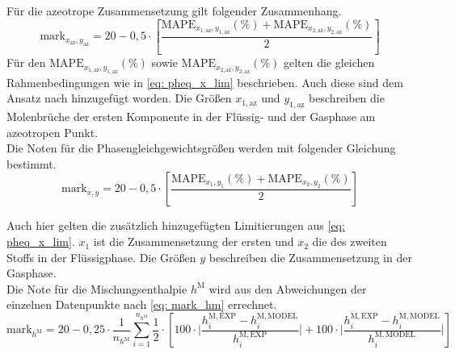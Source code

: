 \documentclass[../thesis.tex]{subfiles}
\begin{document}
Für die azeotrope Zusammensetzung gilt folgender Zusammenhang.
\begin{equation}
\mathrm{mark}_{x_\mathrm{az},y_\mathrm{az}} = 20 - 0,5 \cdot \left[
	\dfrac{\mathrm{MAPE}_{x_{1,\mathrm{az}},y_{1,\mathrm{az}}}(\%) + \mathrm{MAPE}_{x_{2,\mathrm{az}},y_{2,\mathrm{az}}}(\%)}{2}
\right]
\end{equation}
Für den $ \mathrm{MAPE}_{x_{1,\mathrm{az}},y_{1,\mathrm{az}}}(\%) $ sowie $ \mathrm{MAPE}_{x_{2,\mathrm{az}},y_{2,\mathrm{az}}}(\%) $ gelten die gleichen Rahmenbedingungen wie in \autoref{eq: pheq_x_lim} beschrieben. Auch diese sind dem Ansatz nach \cite{jaubert2020benchmark} hinzugefügt worden. Die Größen $ x_{1,\mathrm{az}} $ und $ y_{1,\mathrm{az}} $ beschreiben die Molenbrüche der ersten Komponente in der Flüssig- und der Gasphase am azeotropen Punkt. 
\\

Die Noten für die Phasengleichgewichtsgrößen werden mit folgender Gleichung bestimmt.
\begin{equation}
	\mathrm{mark}_{x,y} = 20 - 0,5 \cdot \left[
		\dfrac{\mathrm{MAPE}_{x_1,y_1}(\%) + \mathrm{MAPE}_{x_2,y_2}(\%)}{2}
	\right]
\end{equation}

Auch hier gelten die zusätzlich hinzugefügten Limitierungen aus \autoref{eq: pheq_x_lim}.
$x_1$ ist die Zusammensetzung der ersten und $x_2$ die des zweiten Stoffs in der Flüssigphase. Die Größen $ y $ beschreiben die Zusammensetzung in der Gasphase.
\\

Die Note für die Mischungsenthalpie $ h^{\mathrm{M}} $ wird aus den Abweichungen der einzelnen Datenpunkte nach \autoref{eq: mark_hm} errechnet.
\begin{equation}
\mathrm{mark}_{h^{\mathrm{M}}} = 20 - 0,25 \cdot \dfrac{1}{n_{h^{\mathrm{M}}}} \sum_{i=1}^{n_{h^{\mathrm{M}}}}
	\dfrac{1}{2} \cdot \left[
		100 \cdot \biggl|
			\dfrac{h_i^{\mathrm{M,EXP}}-h_i^{\mathrm{M,MODEL}}}{h_i^{\mathrm{M,EXP}}} 
			\biggl| 
			+ 100 \cdot \biggl| \dfrac{h_i^{\mathrm{M,EXP}}-h_i^{\mathrm{M,MODEL}}}{h_i^{\mathrm{M,MODEL}}}
		\biggl|
	\right]
\label{eq: mark_hm}
\end{equation}
\end{document}

